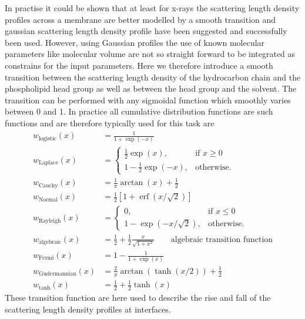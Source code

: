 In practise it could be shown \cite{Pabst2002,Brzustowicz2005} that at least for x-rays the scattering length density profiles across a membrane are better modelled by a smooth transition and gaussian scattering length density profile have been suggested and successfully been used. However, using Gaussian profiles the use of known molecular parameters like molecular volume are not so straight forward to be integrated as constrains for the input parameters.
Here we therefore introduce a smooth transition between the scattering length density of the hydrocarbon chain and the phospholipid head group as well as between the head group and the solvent. The transition can be performed with any sigmoidal function which smoothly varies between 0 and 1. In practice all cumulative distribution functions are such functions and are therefore typically used for this task are
\begin{align}
  w_\mathrm{logistic}(x) &=\frac{1}{1+\exp(-x)} \\
  w_\mathrm{Laplace}(x) &= \begin{cases}
                             \frac12 \exp(x), & \mbox{if } x\geq 0 \\
                             1-\frac12 \exp(-x), & \mbox{otherwise}.
                           \end{cases}  \\
  w_\mathrm{Cauchy}(x) &= \frac{1}{\pi}\arctan(x)+\frac12  \\
  w_\mathrm{Normal}(x) &=\frac12 \left[1+\operatorname{erf}(x/\sqrt{2})\right]  \\
  w_\mathrm{Rayleigh}(x) &= \begin{cases}
                             0, & \mbox{if } x\leq 0 \\
                             1-\exp\left(-x/\sqrt{2}\right), & \mbox{otherwise}.
                           \end{cases} \\
  w_\mathrm{algebraic}(x) &=\frac12 + \frac12 \frac{x}{\sqrt{1+x^2}} \qquad\mbox{algebraic transition function}\\
  w_\mathrm{Fermi}(x) &=1-\frac{1}{1+\exp(x)} \\
  w_\mathrm{Gudermannian}(x) &=\frac{2}{\pi}\arctan\left(\tanh(x/2)\right)+\frac12\\
  w_\mathrm{tanh}(x) &=\frac12 + \frac12 \tanh(x)
\end{align}
These transition function are here used to describe the rise and fall of the scattering length density profiles at interfaces.
